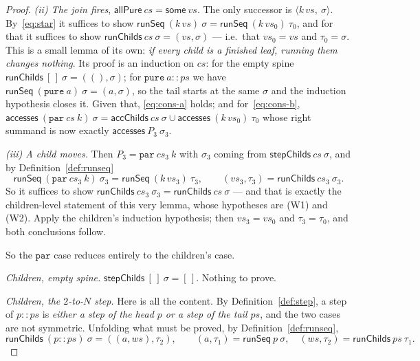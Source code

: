 \documentclass[11pt,a4paper]{article}
\theoremstyle{definition}
\theoremstyle{plain}
\theoremstyle{remark}
\newcommand{\st}{\sigma}
\newcommand{\acc}{\mathsf{accesses}}
\newcommand{\runSeq}{\mathsf{runSeq}}
\begin{document}
\begin{proof}
\emph{(ii) The join fires}, $\mathsf{allPure}\ cs = \mathsf{some}\ vs$. The only successor is
$\langle k\,vs,\ \st\rangle$. By~\eqref{eq:star} it suffices to show
$\runSeq\ (k\,vs)\ \st = \runSeq\ (k\,vs_0)\ \tau_0$, and for that it suffices to show
$\mathsf{runChilds}\ cs\ \st = (vs, \st)$ --- i.e.\ that $vs_0 = vs$ and $\tau_0 = \st$. This
is a small lemma of its own: \emph{if every child is a finished leaf, running them changes
nothing}. Its proof is an induction on $cs$: for the empty spine
$\mathsf{runChilds}\ [\,]\ \st = ((),\st)$; for $\texttt{pure}\ a :: ps$ we have
$\runSeq\ (\texttt{pure}\ a)\ \st = (a,\st)$, so the tail starts at the same $\st$ and the
induction hypothesis closes it. Given that, \eqref{eq:cons-a} holds; and for~\eqref{eq:cons-b},
$\acc\ (\texttt{par}\ cs\ k)\ \st = \mathsf{accChilds}\ cs\ \st \cup \acc\ (k\,vs_0)\ \tau_0$
whose right summand is now exactly $\acc\ P_3\ \st_3$.

\emph{(iii) A child moves.} Then $P_3 = \texttt{par}\ cs_3\ k$ with $\st_3$ coming from
$\mathsf{stepChilds}\ cs\ \st$, and by Definition~\ref{def:runseq}
\[
  \runSeq\ (\texttt{par}\ cs_3\ k)\ \st_3 = \runSeq\ (k\,vs_3)\ \tau_3,
  \qquad (vs_3,\tau_3) = \mathsf{runChilds}\ cs_3\ \st_3 .
\]
So it suffices to show $\mathsf{runChilds}\ cs_3\ \st_3 = \mathsf{runChilds}\ cs\ \st$ ---
and that is exactly the children-level statement of this very lemma, whose hypotheses are
(W1) and (W2). Apply the children's induction hypothesis; then $vs_3 = vs_0$ and
$\tau_3 = \tau_0$, and both conclusions follow.

So the $\texttt{par}$ case reduces entirely to the children's case.

\medskip
\emph{Children, empty spine.} $\mathsf{stepChilds}\ [\,]\ \st = [\,]$. Nothing to prove.

\medskip
\emph{Children, the $2$-to-$N$ step.} Here is all the content. By
Definition~\ref{def:step}, a step of $p :: ps$ is \emph{either a step of the head $p$ or a
step of the tail $ps$}, and the two cases are not symmetric. Unfolding what must be proved,
by Definition~\ref{def:runseq},
\[
  \mathsf{runChilds}\ (p :: ps)\ \st = ((a, ws), \tau_2),
  \qquad (a,\tau_1) = \runSeq\ p\ \st, \quad (ws,\tau_2) = \mathsf{runChilds}\ ps\ \tau_1 .
\]


\end{proof}
\end{document}
